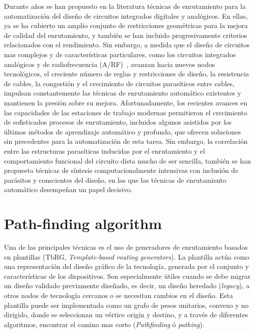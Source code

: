 \documentclass[reprint,amsmath,amssymb,aps]{revtex4-2}
\begin{document}
Durante años se han propuesto en la literatura técnicas de enrutamiento para la automatización del diseño de circuitos integrados digitales y analógicos. En ellas, ya se ha cubierto un amplio conjunto de restricciones geométricas para la mejora de calidad del enrutamiento, y también se han incluido progresivamente criterios relacionados con el rendimiento. Sin embargo, a medida que el diseño de circuitos mas complejos y de características particulares, como los circuitos integrados analógicos y de radiofrecuencia (A/RF)~\cite{unutulmaz, martins}, avanzan hacia nuevos nodos tecnológicos, el creciente número de reglas y restricciones de diseño, la resistencia de cables, la congestión y el crecimiento de circuitos parasíticos entre cables, impulsan constantemente las técnicas de enrutamiento automático existentes y mantienen la presión sobre su mejora. Afortunadamente, los recientes avances en las capacidades de las estaciones de trabajo modernas permitieron el crecimiento de sofisticados procesos de enrutamiento, incluidos algunos asistidos por los últimos métodos de aprendizaje automático y profundo, que ofrecen soluciones sin precedentes para la automatización de esta tarea. Sin embargo, la correlación entre las estructuras parasíticas inducidas por el enrutamiento y el comportamiento funcional del circuito dista mucho de ser sencilla, también se han propuesto técnicas de síntesis computacionalmente intensivas con inclusión de parásitos y conscientes del diseño, en las que las técnicas de enrutamiento automático desempeñan un papel decisivo.\\

\section{Path-finding algorithm}

Una de las principales técnicas es el uso de generadores de enrutamiento basados en plantillas (TbRG, \textit{Template-based routing generators}). La plantilla actúa como una representación del diseño gráfico de la tecnología, generada por el conjunto y características de los dispositivos. Son especialmente útiles cuando se debe migrar un diseño validado previamente diseñado, es decir, un diseño heredado (\textit{legacy}), a otros nodos de tecnología cercanos o se necesitan cambios en el diseño. Esta plantilla puede ser implementada como un grafo de pesos unitarios, convexo y no dirigido, donde se seleccionan un vértice origin y destino, y a través de diferentes algoritmos, encontrar el camino mas corto (\textit{Pathfinding} ó \textit{pathing}).
\end{document}
